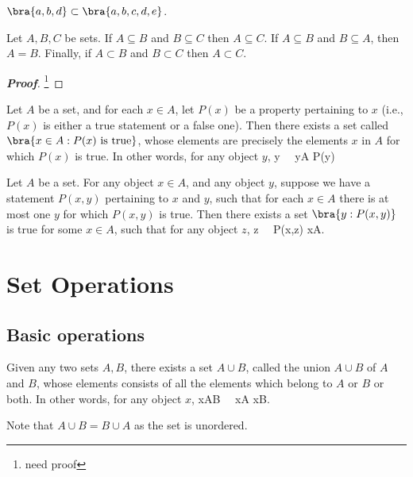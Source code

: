 \begin{example}
$\bra{a,b,d}\subset \bra{a,b,c,d,e}$.
\end{example}

\begin{proposition}
Let $A,B,C$ be sets. If $A\subseteq B$ and $B\subseteq C$ then $A\subseteq C$. If $A\subseteq B$ and $B\subseteq A$, then $A=B$. Finally, if $A\subset B$ and $B\subset C$ then $A\subset C$.
\end{proposition}

\begin{proof}[\bf Proof]
\footnote{need proof}
\end{proof}

\begin{axiom}\label{axm:specification}
Let $A$ be a set, and for each $x\in A$, let $P(x)$ be a property pertaining to $x$ (i.e., $P(x)$ is either a true statement or a false one). Then there exists a set called $\bra{x\in A:P(x)\text{ is true}}$, whose elements are precisely the elements $x$ in $A$ for which $P(x)$ is true. In other words, for any object $y$,
\be
y \in {} \ \ra \ y\in A  P(y) 
\ee
\end{axiom}

\begin{axiom}\label{axm:replacement}
Let $A$ be a set. For any object $x\in A$, and any object $y$, suppose we have a statement $P(x,y)$ pertaining to $x$ and $y$, such that for each $x\in A$ there is at most one $y$ for which $P(x,y)$ is true. Then there exists a set $\bra{y:P(x,y)}$ is true for some $x\in A$, such that for any object $z$,
\be
z\in {} \ \lra \ P(x,z) x\in A.
\ee
\end{axiom}

\section{Set Operations}

\subsection{Basic operations}

\begin{axiom}\label{axm:union_pairwise}
Given any two sets $A,B$, there exists a set $A\cup B$, called the union $A\cup B$ of $A$ and $B$, whose elements consists of all the elements which belong to $A$ or $B$ or both. In other words, for any object $x$,
\be
x\in A\cup B \ \ra \ x\in A x\in B.
\ee

Note that $A\cup B = B\cup A$ as the set is unordered.
\end{axiom}

